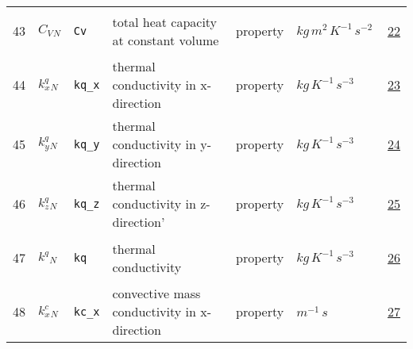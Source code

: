 \begin{longtable}{|p{1cm}|p{2.5cm}|p{4.5cm}|p{8cm}|p{3.0cm}|p{3cm}|p{1cm}|}
                 \\
            43
             & \hypertarget{"v:43"}{ $ {{C_V}}{_{N}} $}
             & \verb|Cv|
             & total heat capacity at constant volume
             & \begin{lay}property \end{lay}
             & $ kg \,m^{2} \,K^{-1} \,s^{-2} \, $
             &                 \hyperlink{"e:22"}{ 22 }
                 \\
            44
             & \hypertarget{"v:44"}{ $ {{k^q_x}}{_{N}} $}
             & \verb|kq_x|
             & thermal conductivity in x-direction
             & \begin{lay}property \end{lay}
             & $ kg \,K^{-1} \,s^{-3} \, $
             &                 \hyperlink{"e:23"}{ 23 }
                 \\
            45
             & \hypertarget{"v:45"}{ $ {{k^q_y}}{_{N}} $}
             & \verb|kq_y|
             & thermal conductivity in y-direction
             & \begin{lay}property \end{lay}
             & $ kg \,K^{-1} \,s^{-3} \, $
             &                 \hyperlink{"e:24"}{ 24 }
                 \\
            46
             & \hypertarget{"v:46"}{ $ {{k^q_z}}{_{N}} $}
             & \verb|kq_z|
             & thermal conductivity in z-direction'
             & \begin{lay}property \end{lay}
             & $ kg \,K^{-1} \,s^{-3} \, $
             &                 \hyperlink{"e:25"}{ 25 }
                 \\
            47
             & \hypertarget{"v:47"}{ $ {{k^q}}{_{N}} $}
             & \verb|kq|
             & thermal conductivity
             & \begin{lay}property \end{lay}
             & $ kg \,K^{-1} \,s^{-3} \, $
             &                 \hyperlink{"e:26"}{ 26 }
                 \\
            48
             & \hypertarget{"v:48"}{ $ {{k^c_x}}{_{N}} $}
             & \verb|kc_x|
             & convective mass conductivity in x-direction
             & \begin{lay}property \end{lay}
             & $ m^{-1} \,s \, $
             &                 \hyperlink{"e:27"}{ 27 }
                 \\

\end{longtable}
